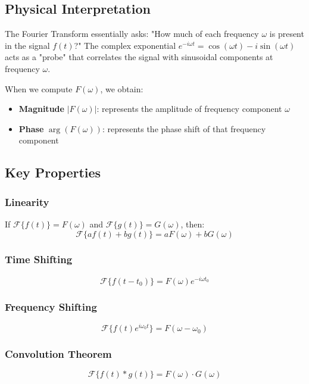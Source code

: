 \documentclass[11pt,a4paper]{article}
\begin{document}
\subsection{Physical Interpretation}

The Fourier Transform essentially asks: "How much of each frequency $\omega$ is present in the signal $f(t)$?" The complex exponential $e^{-i\omega t} = \cos(\omega t) - i\sin(\omega t)$ acts as a "probe" that correlates the signal with sinusoidal components at frequency $\omega$.

When we compute $F(\omega)$, we obtain:
\begin{itemize}
    \item \textbf{Magnitude} $|F(\omega)|$: represents the amplitude of frequency component $\omega$
    \item \textbf{Phase} $\arg(F(\omega))$: represents the phase shift of that frequency component
\end{itemize}

\subsection{Key Properties}

\subsubsection{Linearity}
If $\mathcal{F}\{f(t)\} = F(\omega)$ and $\mathcal{F}\{g(t)\} = G(\omega)$, then:
\begin{equation}
\mathcal{F}\{af(t) + bg(t)\} = aF(\omega) + bG(\omega)
\end{equation}

\subsubsection{Time Shifting}
\begin{equation}
\mathcal{F}\{f(t-t_0)\} = F(\omega)e^{-i\omega t_0}
\end{equation}

\subsubsection{Frequency Shifting}
\begin{equation}
\mathcal{F}\{f(t)e^{i\omega_0 t}\} = F(\omega - \omega_0)
\end{equation}

\subsubsection{Convolution Theorem}
\begin{equation}
\mathcal{F}\{f(t) * g(t)\} = F(\omega) \cdot G(\omega)
\end{equation}
\end{document}
